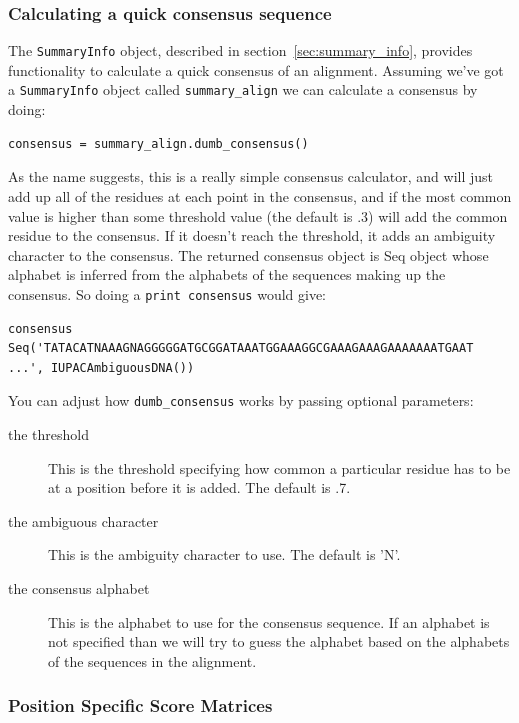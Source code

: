 \documentclass{article}
\begin{document}
\subsubsection{Calculating a quick consensus sequence}
\label{sec:consensus}

The \verb|SummaryInfo| object, described in section~\ref{sec:summary_info}, provides functionality to calculate a quick consensus of an alignment. Assuming we've got a \verb|SummaryInfo| object called \verb|summary_align| we can calculate a consensus by doing:

\begin{verbatim}
consensus = summary_align.dumb_consensus()
\end{verbatim}

As the name suggests, this is a really simple consensus calculator, and will just add up all of the residues at each point in the consensus, and if the most common value is higher than some threshold value (the default is .3) will add the common residue to the consensus. If it doesn't reach the threshold, it adds an ambiguity character to the consensus. The returned consensus object is Seq object whose alphabet is inferred from the alphabets of the sequences making up the consensus. So doing a \verb|print consensus| would give:

\begin{verbatim}
consensus Seq('TATACATNAAAGNAGGGGGATGCGGATAAATGGAAAGGCGAAAGAAAGAAAAAAATGAAT 
...', IUPACAmbiguousDNA())
\end{verbatim} 

You can adjust how \verb|dumb_consensus| works by passing optional parameters:

\begin{description}
\item[the threshold] This is the threshold specifying how common a particular residue has to be at a position before it is added. The default is .7.

\item[the ambiguous character] This is the ambiguity character to use. The default is 'N'.

\item[the consensus alphabet] This is the alphabet to use for the consensus sequence. If an alphabet is not specified than we will try to guess the alphabet based on the alphabets of the sequences in the alignment.
\end{description}

\subsubsection{Position Specific Score Matrices}
\label{sec:pssm}
\end{document}

